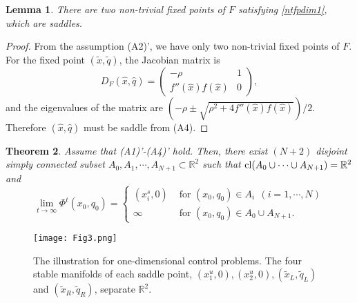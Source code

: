 \documentclass[11pt,reqno]{amsart}
\newtheorem{theorem}{Theorem}[section]
\newtheorem{lemma}[theorem]{Lemma}
\begin{document}
\begin{lemma}
There are two non-trivial fixed points of $F$ satisfying \eqref{ntfpdim1}, which are saddles.
\end{lemma}

\begin{proof}
From the assumption (A2)', we have only two non-trivial fixed points of $F$. For the fixed point $(\tilde{x},\tilde{q})$, the Jacobian matrix is
$$
D_F(\hat{x},\hat{q})=\begin{pmatrix}
-\rho & 1 \\
f''(\hat{x})f(\hat{x}) & 0
\end{pmatrix},
$$
and the eigenvalues of the matrix are $(-\rho\pm \sqrt{\rho^2+4f''(\hat{x})f(\hat{x})})/2$. Therefore $(\hat{x},\hat{q})$ must be saddle from (A4). 
\end{proof}


\begin{theorem}\label{maintheoremdim1}
Assume that (A1)'-(A4)' hold. Then, there exist $(N+2)$ disjoint simply connected subset $A_0,A_1,\cdots,A_{N+1}\subset\mathbb{R}^2$ such that
${\rm cl}(A_0\cup \cdots \cup A_{N+1})=\mathbb{R}^2$ and
 $$
\lim_{t\to\infty}\Phi^t(x_0,q_0)=\begin{cases}
(x_i^s,0) & \text{ for } (x_0,q_0)\in A_i\ \ (i=1,\cdots,N)\\
\infty & \text{ for } (x_0,q_0)\in A_0 \cup A_{N+1}.
\end{cases}
$$
\end{theorem}

\begin{figure}[tp]\label{fig3}
\begin{center}
\texttt{[image: Fig3.png]}
\caption{The illustration for one-dimensional control problems. The four stable manifolds of each saddle point, $(x_1^u,0), (x_2^u,0), (\tilde{x}_L,\tilde{q}_L)$ and $(\tilde{x}_R,\tilde{q}_R)$, separate $\mathbb{R}^2$.}
\end{center}
\end{figure}
\end{document}
